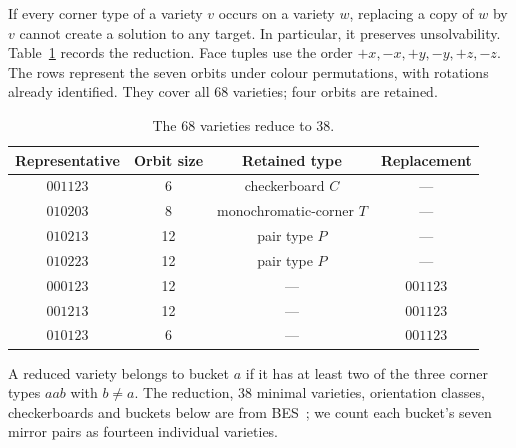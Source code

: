 \documentclass[11pt]{article}
\theoremstyle{remark}
\begin{document}
If every corner type of a variety $v$ occurs on a variety $w$, replacing a
copy of $w$ by $v$ cannot create a solution to any target. In particular, it
preserves unsolvability. Table~\ref{tab:reduction} records the reduction.
Face tuples use the order
$+x,-x,+y,-y,+z,-z$. The rows represent the seven orbits under colour
permutations, with rotations already identified. They cover all 68 varieties;
four orbits are retained.

\begin{table}[ht]
\centering
\begin{tabular}{cccc}
\toprule
Representative & Orbit size & Retained type & Replacement\\
\midrule
$001123$ & 6  & checkerboard $C$ & ---\\
$010203$ & 8  & monochromatic-corner $T$ & ---\\
$010213$ & 12 & pair type $P$ & ---\\
$010223$ & 12 & pair type $P$ & ---\\
\midrule
$000123$ & 12 & --- & $001123$\\
$001213$ & 12 & --- & $001123$\\
$010123$ & 6  & --- & $001123$\\
\bottomrule
\end{tabular}
\caption{The 68 varieties reduce to 38.}
\label{tab:reduction}
\end{table}

A reduced variety belongs to bucket $a$ if it has
at least two of the three corner types $aab$ with $b\ne a$.
The reduction, 38 minimal varieties, orientation classes, checkerboards
and buckets below are from BES~\cite[Section 2, Table 8 and Definition 3]{BES};
we count each bucket's seven mirror pairs as fourteen individual varieties.
\end{document}
